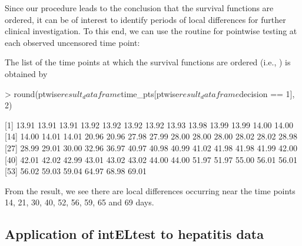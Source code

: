 Since our procedure leads to the conclusion that the survival functions are ordered, it can be of interest to identify periods of local differences for further clinical investigation. To this end,
we can use the routine  for pointwise testing at each observed uncensored time point:\\
The list of the time points at which the survival functions are ordered (i.e., ) is obtained by \\ 
\begin{example}
>   round(ptwise$result_dataframe$time_pts[ptwise$result_dataframe$decision == 1], 2)

 [1] 13.91 13.91 13.91 13.92 13.92 13.92 13.92 13.93 13.98 13.99 13.99 14.00 14.00
[14] 14.00 14.01 14.01 20.96 20.96 27.98 27.99 28.00 28.00 28.00 28.02 28.02 28.98
[27] 28.99 29.01 30.00 32.96 36.97 40.97 40.98 40.99 41.02 41.98 41.98 41.99 42.00
[40] 42.01 42.02 42.99 43.01 43.02 43.02 44.00 44.00 51.97 51.97 55.00 56.01 56.01
[53] 56.02 59.03 59.04 64.97 68.98 69.01
\end{example}
From the result, we see there are local differences occurring near the time points 14, 21, 30, 40, 52, 56, 59, 65 and 69 days. %


\subsection{Application of intELtest to hepatitis data}\label{sec:use_int}

